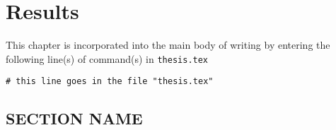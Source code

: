 \chapter{Results}
This chapter is incorporated into the main body of writing by entering the following line(s) of command(s) in \texttt{thesis.tex}
\begin{verbatim}
# this line goes in the file "thesis.tex"

\end{verbatim}

\section{SECTION NAME}


